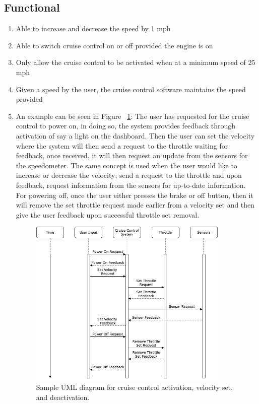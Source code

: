 \documentclass[preprint,11pt,3p]{article}
\begin{document}
\subsection{Functional}
\begin{enumerate}
	\item Able to increase and decrease the speed by 1 mph
	\item Able to switch cruise control on or off provided the engine is on
	\item Only allow the cruise control to be activated when at a minimum speed of 25 mph
	\item Given a speed by the user, the cruise control software maintains the speed provided
	\item An example can be seen in Figure ~\ref{fig:ccUML1}: The user has requested for the cruise control to power on, in doing so, the system provides feedback through activation of say a light on the dashboard. Then the user can set the velocity where the system will then send a request to the throttle waiting for feedback, once received, it will then request an update from the sensors for the speedometer. The same concept is used when the user would like to increase or decrease the velocity; send a request to the throttle and upon feedback, request information from the sensors for up-to-date information. For powering off, once the user either presses the brake or off button, then it will remove the set throttle request made earlier from a velocity set and then give the user feedback upon successful throttle set removal.
		\begin{figure}[h]
			\includegraphics[width=0.9\textwidth]{images/ccUML.png}
			\caption{Sample UML diagram for cruise control activation, velocity set, and deactivation.}
			\label{fig:ccUML1}
		\end{figure}
\end{enumerate}
\end{document}
